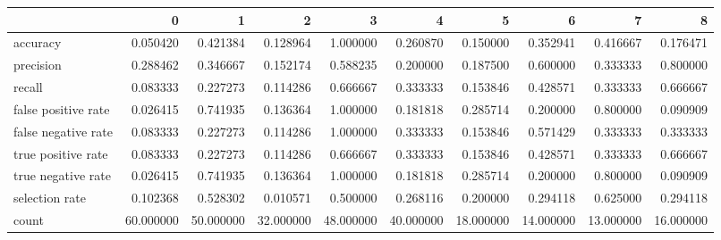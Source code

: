 \begin{tabular}{lrrrrrrrrr}
\toprule
{} &          0 &          1 &          2 &          3 &          4 &          5 &          6 &          7 &          8 \\
\midrule
accuracy            &   0.050420 &   0.421384 &   0.128964 &   1.000000 &   0.260870 &   0.150000 &   0.352941 &   0.416667 &   0.176471 \\
precision           &   0.288462 &   0.346667 &   0.152174 &   0.588235 &   0.200000 &   0.187500 &   0.600000 &   0.333333 &   0.800000 \\
recall              &   0.083333 &   0.227273 &   0.114286 &   0.666667 &   0.333333 &   0.153846 &   0.428571 &   0.333333 &   0.666667 \\
false positive rate &   0.026415 &   0.741935 &   0.136364 &   1.000000 &   0.181818 &   0.285714 &   0.200000 &   0.800000 &   0.090909 \\
false negative rate &   0.083333 &   0.227273 &   0.114286 &   1.000000 &   0.333333 &   0.153846 &   0.571429 &   0.333333 &   0.333333 \\
true positive rate  &   0.083333 &   0.227273 &   0.114286 &   0.666667 &   0.333333 &   0.153846 &   0.428571 &   0.333333 &   0.666667 \\
true negative rate  &   0.026415 &   0.741935 &   0.136364 &   1.000000 &   0.181818 &   0.285714 &   0.200000 &   0.800000 &   0.090909 \\
selection rate      &   0.102368 &   0.528302 &   0.010571 &   0.500000 &   0.268116 &   0.200000 &   0.294118 &   0.625000 &   0.294118 \\
count               &  60.000000 &  50.000000 &  32.000000 &  48.000000 &  40.000000 &  18.000000 &  14.000000 &  13.000000 &  16.000000 \\
\bottomrule
\end{tabular}
